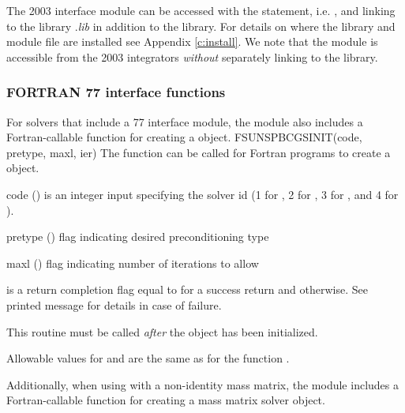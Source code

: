 The {\F} 2003 {\sunlinsolspbcgs} interface module can be accessed with the 
statement, i.e. , and linking to the library
.{\em lib} in addition to the {\CC} library.
For details on where the library and module file \newline
{} are installed see Appendix \ref{c:install}.
We note that the module is accessible from the {\F} 2003 {\sundials} integrators
\textit{without} separately linking to the \newline
{} library.

\subsubsection*{FORTRAN 77 interface functions}
For solvers that include a {\F} 77 interface module, the
{\sunlinsolspbcgs} module also includes a Fortran-callable function
for creating a  object.
%
%
{
  FSUNSPBCGSINIT(code, pretype, maxl, ier)
}
{
  The function  can be called for Fortran programs
  to create a {\sunlinsolspbcgs} object.
}
{
  \begin{args}[pretype]
  \item[code] ()
    is an integer input specifying the solver id (1 for {\cvode}, 2
    for {\ida}, 3 for {\kinsol}, and 4 for {\arkode}).
  \item[pretype] ()
    flag indicating desired preconditioning type
  \item[maxl] ()
    flag indicating number of iterations to allow
  \end{args}
}
{
   is a return completion flag equal to  for a success
  return and  otherwise. See printed message for details in case
  of failure.
}
{
  This routine must be called \emph{after} the {\nvector} object has
  been initialized.

  Allowable values for  and  are the same as for
  the {\CC} function \newline {}. 
}
Additionally, when using {\arkode} with a non-identity
mass matrix, the {\sunlinsolspbcgs} module includes a Fortran-callable
function for creating a  mass matrix solver
object.
%
%
